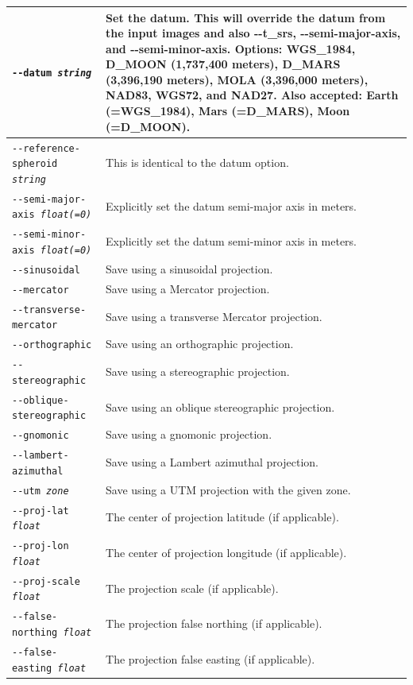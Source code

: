 \begin{longtable}{|p{8cm}|p{9cm}|}
\texttt{-\/-datum \textit{string}} & Set the datum. This will override the datum from the input images and also -\/-t\_srs, -\/-semi-major-axis, and -\/-semi-minor-axis. Options: WGS\_1984, D\_MOON (1,737,400 meters), D\_MARS (3,396,190 meters), MOLA (3,396,000 meters), NAD83, WGS72, and NAD27. Also accepted: Earth (=WGS\_1984), Mars (=D\_MARS), Moon (=D\_MOON). \\ \hline
\texttt{-\/-reference-spheroid \textit{string}} & This is identical to the datum option. \\ \hline
\texttt{-\/-semi-major-axis \textit{float(=0)}} & Explicitly set the datum semi-major axis in meters.\\ \hline
\texttt{-\/-semi-minor-axis \textit{float(=0)}} & Explicitly set the datum semi-minor axis in meters.\\ \hline
\texttt{-\/-sinusoidal} & Save using a sinusoidal projection. \\ \hline
\texttt{-\/-mercator} & Save using a Mercator projection. \\ \hline
\texttt{-\/-transverse-mercator} & Save using a transverse Mercator projection. \\ \hline
\texttt{-\/-orthographic} & Save using an orthographic projection. \\ \hline
\texttt{-\/-stereographic} & Save using a stereographic projection. \\ \hline
\texttt{-\/-oblique-stereographic} & Save using an oblique stereographic projection. \\ \hline
\texttt{-\/-gnomonic} & Save using a gnomonic projection. \\ \hline
\texttt{-\/-lambert-azimuthal} & Save using a Lambert azimuthal projection. \\ \hline
\texttt{-\/-utm \textit{zone}} & Save using a UTM projection with the given zone. \\ \hline
\texttt{-\/-proj-lat \textit{float}} & The center of projection latitude (if applicable). \\ \hline
\texttt{-\/-proj-lon \textit{float}} & The center of projection longitude (if applicable). \\ \hline
\texttt{-\/-proj-scale \textit{float}} & The projection scale (if applicable). \\ \hline
\texttt{-\/-false-northing \textit{float}} & The projection false northing (if applicable). \\ \hline
\texttt{-\/-false-easting \textit{float}} & The projection false easting (if applicable). \\ \hline

\end{longtable}
